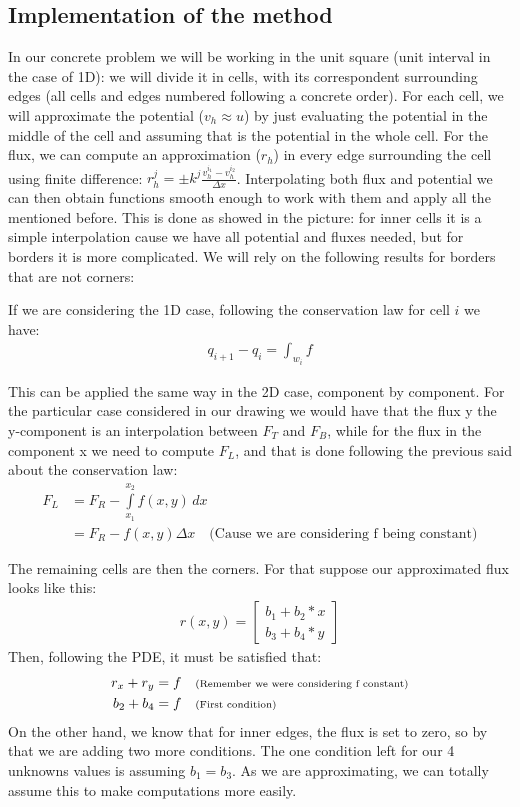 \documentclass{article}
\begin{document}
    \subsection*{Implementation of the method}
    In our concrete problem we will be working in the unit square (unit interval in the case of 1D): we will divide it in cells, with its correspondent surrounding edges (all cells and edges numbered following a concrete order). For each cell, we will approximate the potential ($v_h \approx u$) by just evaluating the potential in the middle of the cell and assuming that is the potential in the whole cell. For the flux, we can compute an approximation ($r_h$) in every edge surrounding the cell using finite difference: $r_h^j = \pm k^j \frac{v_h^{i_1}- v_h^{i_2}}{\Delta x}$. Interpolating both flux and potential we can then obtain functions smooth enough to work with them and apply all the mentioned before.
    This is done as showed in the picture: for inner cells it is a simple interpolation cause we have all potential and fluxes needed, but for borders it is more complicated. We will rely on the following results for borders that are not corners:

    If we are considering the 1D case, following the conservation law for cell $i$ we have:
    \begin{align*}
        q_{i+1} - q_i =  \int_{w_i} f
    \end{align*}

    This can be applied the same way in the 2D case, component by component. For the particular case considered in our drawing we would have that the flux y the y-component is an interpolation between $F_T$ and $F_B$, while for the flux in the component x we need to compute $F_L$, and that is done following the previous said about the conservation law:
    \begin{align*}
        F_L &= F_R - \int\limits_{x_1}^{x_2} f(x,y) \,dx\ \\
        &=  F_R - f(x,y)\Delta x \quad \text{(Cause we are considering f being constant)}
    \end{align*}

    The remaining cells are then the corners. For that suppose our approximated flux looks like this:
    \begin{align*}
        r(x,y) = \begin{bmatrix}
            b_1+b_2*x\\
            b_3+b_4*y
            \end{bmatrix}
    \end{align*}
    Then, following the PDE, it must be satisfied that:
    \begin{align*}
        r_x + r_y &= f \quad \text{\scriptsize{(Remember we were considering f constant)}}\\
        b_2 + b_4 &= f \quad \text{\scriptsize{(First condition)}}
    \end{align*}
    On the other hand, we know that for inner edges, the flux is set to zero, so by that we are adding two more conditions. The one condition left for our 4 unknowns values is assuming $b_1 = b_3$. As we are approximating, we can totally assume this to make computations more easily. 
\end{document}
